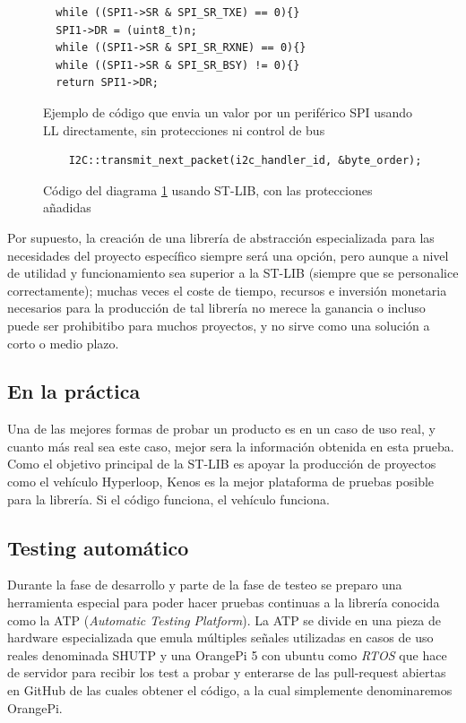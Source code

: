 \documentclass{report}
\begin{document}
\begin{figure}[h]
\begin{lstlisting}
  while ((SPI1->SR & SPI_SR_TXE) == 0){}
  SPI1->DR = (uint8_t)n;
  while ((SPI1->SR & SPI_SR_RXNE) == 0){}
  while ((SPI1->SR & SPI_SR_BSY) != 0){}
  return SPI1->DR;

  \end{lstlisting}
  \caption{Ejemplo de código que envia un valor por un periférico SPI usando LL directamente, sin protecciones ni control de bus}
  \label{LLSPICode}
\end{figure}

\begin{figure}[h]
  \begin{lstlisting}
    I2C::transmit_next_packet(i2c_handler_id, &byte_order);
    \end{lstlisting}
    \caption{Código del diagrama \ref{LLSPICode} usando ST-LIB, con las protecciones añadidas}
    \label{STLIBSPICode}
  \end{figure}
\par \vspace{0.3cm}

Por supuesto, la creación de una librería de abstracción especializada para las necesidades del proyecto específico siempre será una opción, pero aunque a nivel de utilidad y funcionamiento sea superior a la ST-LIB (siempre que se personalice correctamente); muchas veces el coste de tiempo, recursos e inversión monetaria necesarios para la producción de tal librería no merece la ganancia o incluso puede ser prohibitibo para muchos proyectos, y no sirve como una solución a corto o medio plazo. 

\subsection{En la práctica}
Una de las mejores formas de probar un producto es en un caso de uso real, y cuanto más real sea este caso, mejor sera la información obtenida en esta prueba. Como el objetivo principal de la ST-LIB es apoyar la producción de proyectos como el vehículo Hyperloop, Kenos es la mejor plataforma de pruebas posible para la librería. Si el código funciona, el vehículo funciona. 
\par \vspace{0.3cm}


\subsection{Testing automático}
Durante la fase de desarrollo y parte de la fase de testeo se preparo una herramienta especial para poder hacer pruebas continuas a la librería conocida como la ATP (\textit{Automatic Testing Platform}). La ATP se divide en una pieza de hardware especializada que emula múltiples señales utilizadas en casos de uso reales denominada SHUTP y una OrangePi 5 con ubuntu como \textit{RTOS} que hace de servidor para recibir los test a probar y enterarse de las pull-request abiertas en GitHub de las cuales obtener el código, a la cual simplemente denominaremos OrangePi. \par \vspace{0.3cm}
\end{document}
